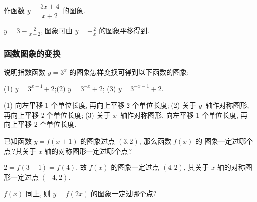   \lianxi
  \begin{exercise}[s]
    作函数 $y=\dfrac{3x+4}{x+2}$ 的图象.
  \end{exercise}

  \beginsolution
    $y=3-\frac2{x+2}$, 图象可由 $y=-\frac2x$ 的图象平移得到.
    \begin{center}
    \end{center}
  \endsolution
  
  \subsubsection{函数图象的变换}
  \begin{example}
    说明指数函数 $y=3^x$ 的图象怎样变换可得到以下函数的图象:
    
    (1) $y=3^{x+1}+2$;\qquad  (2) $y=3^{-x}+2$;\qquad
    (3) $y=3^{-x-1}+2$.
  \end{example}

  \beginsolution
    (1) 向左平移 $1$ 个单位长度, 再向上平移 $2$ 个单位长度;
    (2) 关于 $y$~轴作对称图形, 再向上平移 $2$ 个单位长度;
    (3) 关于 $x$~轴作对称图形, 向左平移 $1$ 个单位长度, 再向上平移 $2$ 个单位长度.
  \endsolution
  
  \lianxi
  \begin{exercise}[s]
    已知函数 $y=f(x+1)$ 的图象过点 $(3,2)$, 那么函数 $f(x)$ 的
    图象一定过哪个点\,?其关于 $x$ 轴的对称图形一定过哪个点\,?
  \end{exercise}

  \beginsolution
    $2=f(3+1)=f(4)$, 故 $f(x)$ 的图象一定过点 $(4,2)$, 其关于 $x$ 轴的对称图形一定过点 $(-4,2)$.
    
    \varexercise $f(x)$ 同上, 则 $y=f(2x)$ 的图象一定过哪个点?
    
